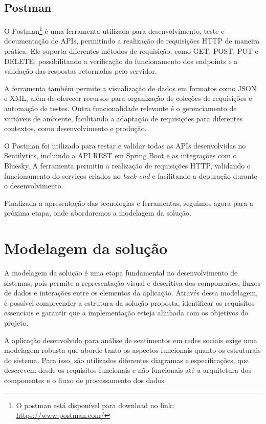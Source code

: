 \documentclass[
	12pt,				%
	oneside,			%
	a4paper,			%
	english,			%
	french,				%
	spanish,			%
	brazil				%
	]{abntex2}
\begin{document}
\hypertarget{postman}{%
\subsection{Postman}\label{postman}}

O Postman\footnote{O postman está disponível para download no link:
  \url{https://www.postman.com/}} é uma ferramenta utilizada para
desenvolvimento, teste e documentação de APIs, permitindo a realização
de requisições HTTP de maneira prática. Ele suporta diferentes métodos
de requisição, como GET, POST, PUT e DELETE, possibilitando a
verificação do funcionamento dos endpoints e a validação das respostas
retornadas pelo servidor.

A ferramenta também permite a visualização de dados em formatos como
JSON e XML, além de oferecer recursos para organização de coleções de
requisições e automação de testes. Outra funcionalidade relevante é o
gerenciamento de variáveis de ambiente, facilitando a adaptação de
requisições para diferentes contextos, como desenvolvimento e produção.

O Postman foi utilizado para testar e validar todas as APIs
desenvolvidas no Sentilytics, incluindo a API REST em Spring Boot e as
integrações com o Bluesky. A ferramenta permitiu a realização de
requisições HTTP, validando o funcionamento do serviços criados no
\emph{back-end} e facilitando a depuração durante o desenvolvimento.

Finalizada a apresentação das tecnologias e ferramentas, seguimos agora
para a próxima etapa, onde abordaremos a modelagem da solução.

\hypertarget{modelagem-da-soluuxe7uxe3o}{%
\section{Modelagem da solução}\label{modelagem-da-soluuxe7uxe3o}}

A modelagem da solução é uma etapa fundamental no desenvolvimento de
sistemas, pois permite a representação visual e descritiva dos
componentes, fluxos de dados e interações entre os elementos da
aplicação. Através dessa modelagem, é possível compreender a estrutura
da solução proposta, identificar os requisitos essenciais e garantir que
a implementação esteja alinhada com os objetivos do projeto.

A aplicação desenvolvida para análise de sentimentos em redes sociais
exige uma modelagem robusta que aborde tanto os aspectos funcionais
quanto os estruturais do sistema. Para isso, são utilizados diferentes
diagramas e especificações, que descrevem desde os requisitos funcionais
e não funcionais até a arquitetura dos componentes e o fluxo de
processamento dos dados.
\end{document}
